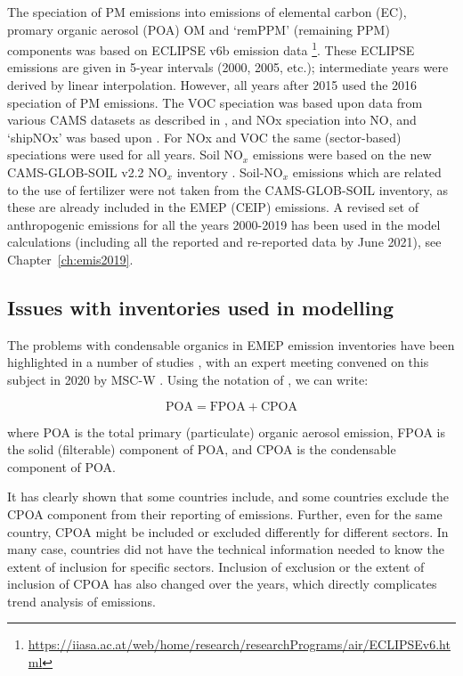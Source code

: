 The speciation of PM emissions into emissions of elemental carbon (EC), promary organic aerosol (POA) OM and `remPPM' (remaining PPM) components was based on ECLIPSE v6b emission data \footnote{\url{https://iiasa.ac.at/web/home/research/researchPrograms/air/ECLIPSEv6.html}}. These ECLIPSE emissions are given in 5-year intervals (2000, 2005, etc.); intermediate years were derived by linear interpolation. However, all years after 2015 used the 2016 speciation of PM emissions. The VOC speciation was based upon data from various CAMS datasets as described in \cite{R2020:ModDev}, and NOx speciation into NO,  and `shipNOx' was based upon . For NOx and VOC the same (sector-based) speciations were used for all years.
Soil NO$_x$ emissions were based on the new CAMS-GLOB-SOIL v2.2 NO$_x$ inventory \citet{SimpsonDarras:2021}. Soil-NO$_x$ emissions which are related to the use of fertilizer were not taken from the CAMS-GLOB-SOIL inventory, as these are already included in the EMEP (CEIP) emissions.
A revised set of anthropogenic emissions for all the years 2000-2019 has been used in the model calculations (including all the reported and re-reported data by June 2021), see Chapter~\ref{ch:emis2019}.


\subsection{Issues with inventories used in modelling}
\label{ss:IssuesECOC}


The problems with condensable organics in EMEP emission
inventories have been highlighted in a number of studies
\citep{DeniervanderGon2015,R2015:SVOC,TFMM2018,R2019:SVOC,R2020:CAMSREF2,R2020:SVOC},
with an expert meeting convened on this subject in 2020 by MSC-W
\citep{CONDws2020}. Using the notation of \citep{CONDws2020}, we can
write:


\begin{equation}
  \mbox{POA} = \mbox{FPOA} + \mbox{CPOA}
\end{equation}

where POA is the total primary (particulate) organic aerosol emission, FPOA
is the solid (filterable)  component of POA, and CPOA is the condensable
component of POA.

It has clearly shown that some countries include, and some countries
exclude the CPOA component from their reporting of \pmfine emissions. Further, even
for the same country, CPOA might be included or excluded differently for
different sectors. In many case, countries did not have the technical
information needed to know the extent of inclusion for specific
sectors. Inclusion of exclusion or the extent of inclusion of CPOA has
also changed over the years, which directly complicates trend analysis
of emissions. 

